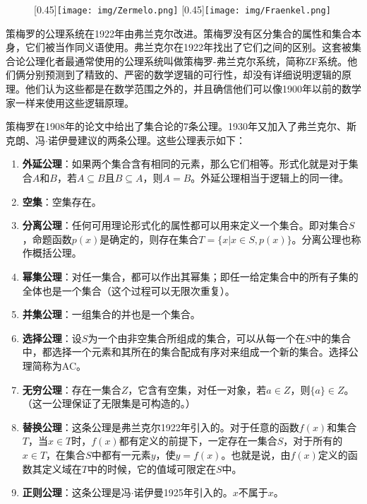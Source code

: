 \documentclass[b5paper]{ctexart}
\begin{document}
\begin{figure}[htbp]
  \centering
  [0.45\linewidth]{\texttt{[image: img/Zermelo.png]}} \quad
  [0.45\linewidth]{\texttt{[image: img/Fraenkel.png]}}
  \caption{}
  \label{fig:Zermelo-and-Fraenkel}
\end{figure}

 
策梅罗的公理系统在1922年由弗兰克尔改进。策梅罗没有区分集合的属性和集合本身，它们被当作同义语使用。弗兰克尔在1922年找出了它们之间的区别。这套被集合论公理化者最通常使用的公理系统叫做策梅罗-弗兰克尔系统，简称ZF系统。他们俩分别预测到了精致的、严密的数学逻辑的可行性，却没有详细说明逻辑的原理。他们认为这些都是在数学范围之外的，并且确信他们可以像1900年以前的数学家一样来使用这些逻辑原理。

策梅罗在1908年的论文中给出了集合论的7条公理。1930年又加入了弗兰克尔、斯克朗、冯$\cdot$诺伊曼建议的两条公理。这些公理表示如下：

\begin{enumerate}
\item \textbf{外延公理}：如果两个集合含有相同的元素，那么它们相等。形式化就是对于集合$A$和$B$，若$A \subseteq B$且$B \subseteq A$，则$A = B$。外延公理相当于逻辑上的同一律。
\item \textbf{空集}：空集存在。
\item \textbf{分离公理}：任何可用理论形式化的属性都可以用来定义一个集合。即对集合$S$，命题函数$p(x)$是确定的，则存在集合$T = \{ x | x \in S, p(x)\}$。分离公理也称作概括公理。
\item \textbf{幂集公理}：对任一集合，都可以作出其幂集；即任一给定集合中的所有子集的全体也是一个集合（这个过程可以无限次重复）。
\item \textbf{并集公理}：一组集合的并也是一个集合。
\item \textbf{选择公理}：设$S$为一个由非空集合所组成的集合，可以从每一个在$S$中的集合中，都选择一个元素和其所在的集合配成有序对来组成一个新的集合。选择公理简称为AC。
\item \textbf{无穷公理}：存在一集合$Z$，它含有空集，对任一对象，若$a \in Z$，则$\{a\} \in Z$。（这一公理保证了无限集是可构造的。）
\item \textbf{替换公理}：这条公理是弗兰克尔1922年引入的。对于任意的函数$f(x)$和集合$T$，当$x \in T$时，$f(x)$都有定义的前提下，一定存在一集合$S$，对于所有的$x \in T$，在集合$S$中都有一元素$y$，使$y = f(x)$。也就是说，由$f(x)$定义的函数其定义域在$T$中的时候，它的值域可限定在$S$中。
\item \textbf{正则公理}：这条公理是冯$\cdot$诺伊曼1925年引入的。$x$不属于$x$。
\end{enumerate}
\end{document}
